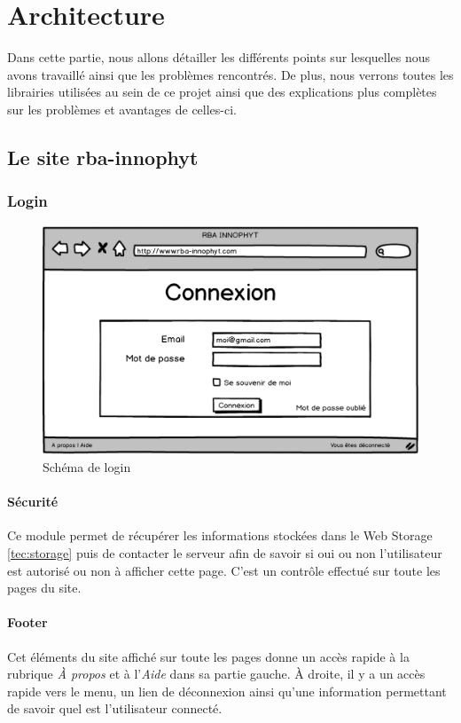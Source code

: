 \documentclass[twoside]{EPURapport}
\begin{document}
\chapter{Architecture}

Dans cette partie, nous allons détailler les différents points sur lesquelles nous avons travaillé ainsi que les problèmes rencontrés. De plus, nous verrons toutes les librairies utilisées au sein de ce projet ainsi que des explications plus complètes sur les problèmes et avantages de celles-ci.

	\section{Le site rba-innophyt}
	
		\subsection{Login}
		
		\begin{figure}[hbtp]
			\centering
			\includegraphics[scale=0.5]{images/login.png}
			\caption{Schéma de login}
		\end{figure}			
		
			\subsubsection{Sécurité}
			Ce module permet de récupérer les informations stockées dans le Web Storage \ref{tec:storage} puis de contacter le serveur afin de savoir si oui ou non l'utilisateur est autorisé ou non à afficher cette page. C'est un contrôle effectué sur toute les pages du site.	
			
			\subsubsection{Footer}
			Cet éléments du site affiché sur toute les pages donne un accès rapide à la rubrique \emph{À propos} et à l'\emph{Aide} dans sa partie gauche. À droite, il y a un accès rapide vers le menu, un lien de déconnexion ainsi qu'une information permettant de savoir quel est l'utilisateur connecté.			
			
\end{document}
